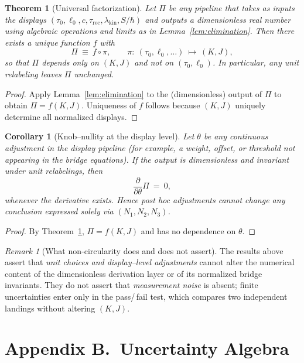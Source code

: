 \documentclass[11pt]{article}
\theoremstyle{plain}
\newtheorem{theorem}{Theorem}
\newtheorem{corollary}{Corollary}
\theoremstyle{definition}
\theoremstyle{remark}
\newtheorem*{remark}{Remark}
\begin{document}
\begin{theorem}[Universal factorization]\label{thm:factorization}
Let \(\Pi\) be any pipeline that takes as inputs the displays \((\tau_{0},\ell_{0},c,\tau_{\mathrm{rec}},\lambda_{\mathrm{kin}},S/\hbar)\) and outputs a dimensionless real number using algebraic operations and limits as in Lemma~\ref{lem:elimination}. Then there exists a unique function \(f\) with
\[
\Pi\ \equiv\ f\circ \pi,\qquad \pi:\ (\tau_{0},\ell_{0},\ldots)\ \mapsto\ (K,J),
\]
so that \(\Pi\) depends only on \((K,J)\) and not on \((\tau_{0},\ell_{0})\). In particular, any unit relabeling leaves \(\Pi\) unchanged.
\end{theorem}

\begin{proof}
Apply Lemma~\ref{lem:elimination} to the (dimensionless) output of \(\Pi\) to obtain \(\Pi=f(K,J)\). Uniqueness of \(f\) follows because \((K,J)\) uniquely determine all normalized displays.
\end{proof}

\begin{corollary}[Knob–nullity at the display level]
Let \(\theta\) be any continuous adjustment in the display pipeline (for example, a weight, offset, or threshold not appearing in the bridge equations). If the output is dimensionless and invariant under unit relabelings, then
\[
\frac{\partial}{\partial\theta}\Pi\ =\ 0,
\]
whenever the derivative exists. Hence post hoc adjustments cannot change any conclusion expressed solely via \((N_{1},N_{2},N_{3})\).
\end{corollary}

\begin{proof}
By Theorem~\ref{thm:factorization}, \(\Pi=f(K,J)\) and has no dependence on \(\theta\).
\end{proof}

\begin{remark}[What non-circularity does and does not assert]
The results above assert that \emph{unit choices and display–level adjustments} cannot alter the numerical content of the dimensionless derivation layer or of its normalized bridge invariants. They do not assert that \emph{measurement noise} is absent; finite uncertainties enter only in the pass/\,fail test, which compares two independent landings without altering \((K,J)\).
\end{remark}

\section*{Appendix B.\ Uncertainty Algebra}
\end{document}
